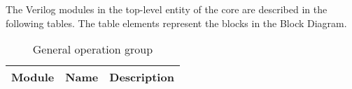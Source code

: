 The Verilog modules in the top-level entity of the core are         described in the following tables. The table elements represent         the blocks in the Block Diagram.

\begin{table}[H]
  \centering
  \begin{tabularx}{\textwidth}{|l|l|X|}

    \hline
    \rowcolor{iob-green}
    {\bf Module} & {\bf Name} & {\bf Description}  \\ \hline \hline

    

  \end{tabularx}
  \caption{General operation group}
  \label{general_operation_blocks_tab:is}
\end{table}
\clearpage
